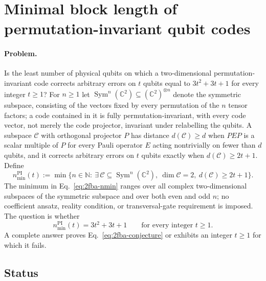 \section{Minimal block length of permutation-invariant qubit codes}
\label{sec:op_2fba72464e1b4de4}

\paragraph{Problem.}
Is the least number of physical qubits on which a two-dimensional
permutation-invariant code corrects arbitrary errors on $t$ qubits equal to
$3t^2+3t+1$ for every integer $t\geq1$?  For $n\geq1$ let
$\operatorname{Sym}^n(\mathbb C^2)\subseteq(\mathbb C^2)^{\otimes n}$ denote the
symmetric subspace, consisting of the vectors fixed by every permutation of the
$n$ tensor factors; a code contained in it is fully permutation-invariant, with
every code vector, not merely the code projector, invariant under relabelling
the qubits.  A subspace $\mathcal C$ with orthogonal projector $P$ has distance
$d(\mathcal C)\geq d$ when $PEP$ is a scalar multiple of $P$ for every Pauli
operator $E$ acting nontrivially on fewer than $d$ qubits, and it corrects
arbitrary errors on $t$ qubits exactly when $d(\mathcal C)\geq 2t+1$.  Define
\begin{equation}
  n_{\min}^{\mathrm{PI}}(t):=\min\bigl\{n\in\mathbb N:\
    \exists\,\mathcal C\subseteq\operatorname{Sym}^n(\mathbb C^2),\
    \dim\mathcal C=2,\ d(\mathcal C)\geq 2t+1\bigr\}.
  \label{eq:2fba-nmin}
\end{equation}
The minimum in Eq.~\eqref{eq:2fba-nmin} ranges over all complex
two-dimensional subspaces of the symmetric subspace and over both even and odd
$n$; no coefficient ansatz, reality condition, or transversal-gate requirement
is imposed.  The question is whether
\begin{equation}
  n_{\min}^{\mathrm{PI}}(t)=3t^2+3t+1
  \qquad\text{for every integer } t\geq1 .
  \label{eq:2fba-conjecture}
\end{equation}
A complete answer proves Eq.~\eqref{eq:2fba-conjecture} or exhibits an integer
$t\geq1$ for which it fails.

\subsection*{Status}

